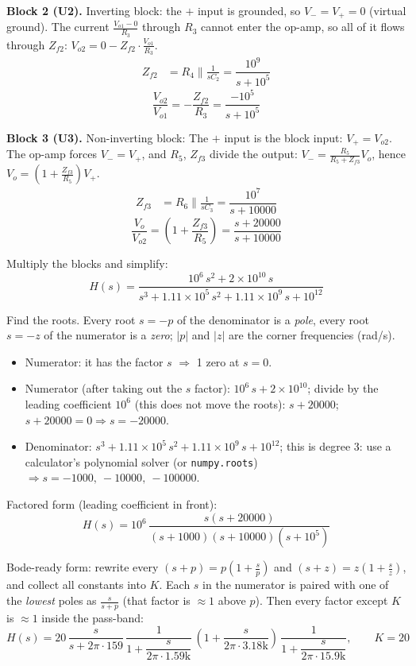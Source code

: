 \documentclass[11pt]{article}
\newcommand{\solstep}[2]{\par\medskip{\color{stepc}\textbf{Step #1 --- #2}}\par\nopagebreak}
\begin{document}
\textbf{Block 2 (U2).} Inverting block: the $+$ input is grounded, so $V_- = V_+ = 0$ (virtual ground). The current $\frac{V_{o1} - 0}{R_{3}}$ through $R_{3}$ cannot enter the op-amp, so all of it flows through $Z_{f2}$: $V_{o2} = 0 - Z_{f2}\cdot\frac{V_{o1}}{R_{3}}$.\begin{align*}
Z_{f2} &= R_{4} \parallel \frac{1}{sC_{2}} = \dfrac{10^{9}}{s + 10^{5}}
\end{align*}
\[
\frac{V_{o2}}{V_{o1}} = -\frac{Z_{f2}}{R_{3}} = \dfrac{-10^{5}}{s + 10^{5}}
\]

\textbf{Block 3 (U3).} Non-inverting block: The $+$ input is the block input: $V_+ = V_{o2}$. The op-amp forces $V_-=V_+$, and $R_{5}$, $Z_{f3}$ divide the output: $V_- = \frac{R_{5}}{R_{5} + Z_{f3}}V_{o}$, hence $V_{o} = \left(1+\frac{Z_{f3}}{R_{5}}\right)V_+$.\begin{align*}
Z_{f3} &= R_{6} \parallel \frac{1}{sC_{3}} = \dfrac{10^{7}}{s + 10000}
\end{align*}
\[
\frac{V_{o}}{V_{o2}} = \left(1+\frac{Z_{f3}}{R_{5}}\right) = \dfrac{s + 20000}{s + 10000}
\]

Multiply the blocks and simplify:\[
H(s) = \dfrac{10^{6}\,s^{2} + 2\times 10^{10}\,s}{s^{3} + 1.11\times 10^{5}\,s^{2} + 1.11\times 10^{9}\,s + 10^{12}}
\]

\solstep{5}{Standard (Bode-ready) form}Find the roots. Every root $s=-p$ of the denominator is a \emph{pole}, every root $s=-z$ of the numerator is a \emph{zero}; $|p|$ and $|z|$ are the corner frequencies (rad/s).
\begin{itemize}[leftmargin=*,itemsep=2pt]
\item Numerator: it has the factor $s$ $\Rightarrow$ 1 zero at $s=0$.
\item Numerator (after taking out the $s$ factor): $10^{6}\,s + 2\times 10^{10}$; divide by the leading coefficient $10^{6}$ (this does not move the roots): $s + 20000$; $s + 20000 = 0 \Rightarrow s = -20000$.
\item Denominator: $s^{3} + 1.11\times 10^{5}\,s^{2} + 1.11\times 10^{9}\,s + 10^{12}$; this is degree 3: use a calculator's polynomial solver (or \texttt{numpy.roots}) $\Rightarrow s = -1000,\ -10000,\ -100000$.
\end{itemize}

Factored form (leading coefficient in front):
\[
H(s) = 10^{6}\,\dfrac{s(s+20000)}{(s+1000)(s+10000)(s+10^{5})}
\]

Bode-ready form: rewrite every $(s+p) = p\left(1+\frac{s}{p}\right)$ and $(s+z) = z\left(1+\frac{s}{z}\right)$, and collect all constants into $K$. Each $s$ in the numerator is paired with one of the \emph{lowest} poles as $\frac{s}{s+p}$ (that factor is $\approx 1$ above $p$). Then every factor except $K$ is $\approx 1$ inside the pass-band:
\[
H(s) = 20\,\dfrac{s}{s+2\pi\cdot 159}\,\dfrac{1}{1+\dfrac{s}{2\pi\cdot 1.59\mathrm{k}}}\,\left(1+\dfrac{s}{2\pi\cdot 3.18\mathrm{k}}\right)\,\dfrac{1}{1+\dfrac{s}{2\pi\cdot 15.9\mathrm{k}}},\qquad K = 20
\]
\end{document}
